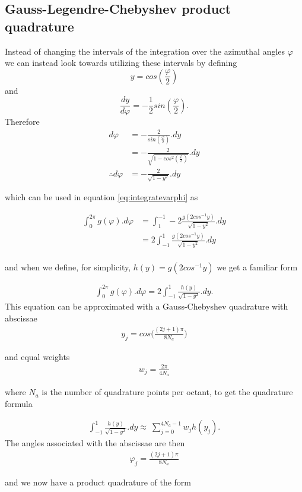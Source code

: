 \documentclass[11pt,letterpaper,titlepage]{article}
\newcommand{\beq}{\begin{equation*}
\begin{aligned}}
\newcommand{\eeq}{\end{aligned}
\end{equation*}}
\newcommand{\beqn}{\begin{equation}
	\begin{aligned}}
\newcommand{\eeqn}{\end{aligned}
	\end{equation}}
\numberwithin{equation}{section}
\begin{document}
\begin{appendices}
\newpage
\subsection{Gauss-Legendre-Chebyshev product quadrature}
Instead of changing the intervals of the integration over the azimuthal angles $\varphi$ we can instead look towards utilizing these intervals by defining
$$
y = cos(\frac{\varphi}{2})
$$
and
$$
\frac{dy}{d\varphi} = -\frac{1}{2}sin(\frac{\varphi}{2}).
$$
Therefore
\beq
d\varphi &= - \frac{2}{sin(\frac{\varphi}{2})}.dy \\
&= - \frac{2}{\sqrt{  1 - cos^2 (\frac{\varphi}{2})    }}.dy\\
\therefore d\varphi &= - \frac{2}{\sqrt{  1 - y^2     }}.dy
\eeq

which can be used in equation \ref{eq:integratevarphi} as

\beq
\int_0^{2\pi} g(\varphi).d\varphi 
&= \int_1^{-1} -2 \frac{g(2cos^{-1}y)}{\sqrt{  1 - y^2     }}.dy \\
&=2 \int_{-1}^{1}  \frac{g(2cos^{-1}y)}{\sqrt{  1 - y^2     }}.dy \\
\eeq

and when we define, for simplicity, $h(y)=g(2cos^{-1}y)$ we get a familiar form

\beqn
\int_0^{2\pi} g(\varphi).d\varphi = 2\int_{-1}^1 \frac{h(y)}{ \sqrt{1-y^2}  }.dy.
\eeqn
\newline
This equation can be approximated with a Gauss-Chebyshev quadrature with abscissae
\beqn
y_j = cos\biggr(  \frac{(2j+1)\pi}{8N_a}  \biggr)
\eeqn

and equal weights
\beqn
w_j = \frac{2\pi}{4N_a}
\eeqn

where $N_a$ is the number of quadrature points per octant, to get the quadrature formula

\beqn
\int_{-1}^1 \frac{h(y)}{ \sqrt{1-y^2}  }.dy \approx \  \sum_{j=0}^{4N_a-1} w_j h(y_j).
\eeqn
\newline
The angles associated with the abscissae are then 
\beqn
\varphi_j = \frac{(2j+1)\pi}{8N_a} 
\eeqn

and we now have a product quadrature of the form


\end{appendices}
\end{document}
